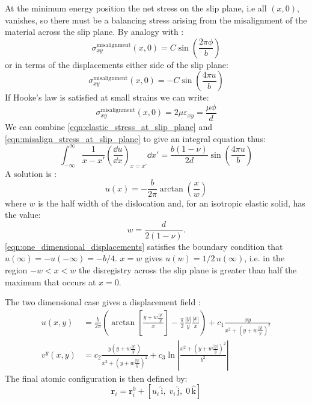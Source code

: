 At the minimum energy position the net stress on the slip plane, i.e all $(x,0)$, vanishes, so there must be a balancing stress arising from the misalignment of the material across the slip plane. By analogy with \citet{Frenkel1926}:
\begin{equation}
\sigma_{xy}^{\text{misalignment}}(x,0) = C \sin \left( \frac{2\pi \phi}{b} \right)
\end{equation}
or in terms of the displacements either side of the slip plane:
\begin{equation}
\sigma_{xy}^{\text{misalignment}}(x,0) = -C \sin \left( \frac{4\pi u}{b} \right)
\end{equation}
If Hooke's law is satisfied at small strains we can write:
\begin{equation}
\sigma_{xy}^{\text{misalignment}}(x,0) = 2 \mu \varepsilon_{xy} = \frac{\mu{}\phi}{d}
\label{eqn:misalign_stress_at_slip_plane}
\end{equation}
We can combine \autoref{eqn:elastic_stress_at_slip_plane} and \autoref{eqn:misalign_stress_at_slip_plane} to give an integral equation thus:
\begin{equation}
\int^{\infty}_{-\infty} \frac{1}{x-x'} \left(\!\frac{\dd u}{\dd x}\right)_{x=x'} \dd x' = \frac{b(1-\nu)}{2d} \sin\left(\frac{4\pi{}u}{b}\right)
\end{equation}
A solution is \cite{hirth_lothe1982peierls_displacements, Eshelby1949}:
\begin{equation}
u(x) = -\frac{b}{2\pi} \arctan \left( \frac{x}{w} \right)
\label{eqn:one_dimensional_displacements}
\end{equation}
where $w$ is the half width of the dislocation and, for an isotropic elastic solid, has the value:
\begin{equation}
w = \frac{d}{2(1-\nu)}.\label{eqn:half_width}
\end{equation}
\autoref{eqn:one_dimensional_displacements} satisfies the boundary condition that $u(\infty) = - u(-\infty) = -b/4$. $x=w$ gives $u(w)=1/2\, u(\infty)$, i.e. in the region $-w < x < w$ the disregistry across the slip plane is greater than half the maximum that occurs at $x=0$.

The two dimensional case gives a displacement field \cite{Eshelby1949,Leibfried1949,nabarro1987theory}:
\begin{subequations}\label{eqn:displacements}
\begin{align}
u(x,y) &= \frac{b}{2\pi} \left( \arctan \left[ \frac{y +  w\frac{|y|}{y}}{x} \right] - \frac{\pi}{2} \frac{|y|}{y} \frac{|x|}{x} \right) + c_1 \frac{xy}{x^{2} + (y + w\frac{|y|}{y} )^2} \\
v^y(x,y) &= c_2 \frac{y(y +  w \frac{|y|}{y})}{x^2 + (y +  w \frac{|y|}{y})^2} + c_3 \ln \left| \frac{x^2 + (y +  w \frac{|y|}{y})^2}{b^2} \right|
\end{align}
\label{eqn:displacement_field}
\end{subequations}
The final atomic configuration is then defined by:
\begin{equation}
\bm{r}_i = \bm{r}_i^0 + [u_i\,\bm{\mathrm{\hat{i}}},\; v_i\,\bm{\mathrm{\hat{j}}},\; 0\,\bm{\mathrm{\hat{k}}}]
\end{equation}

